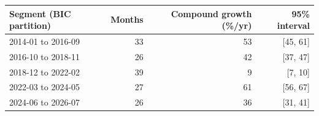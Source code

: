 \begin{tabular}{lrrr}
\toprule
Segment (BIC partition) & Months & Compound growth (\%/yr) & 95\% interval \\
\midrule
2014-01 to 2016-09 & 33 & 53 & [45, 61] \\
2016-10 to 2018-11 & 26 & 42 & [37, 47] \\
2018-12 to 2022-02 & 39 & 9 & [7, 10] \\
2022-03 to 2024-05 & 27 & 61 & [56, 67] \\
2024-06 to 2026-07 & 26 & 36 & [31, 41] \\
\bottomrule
\end{tabular}